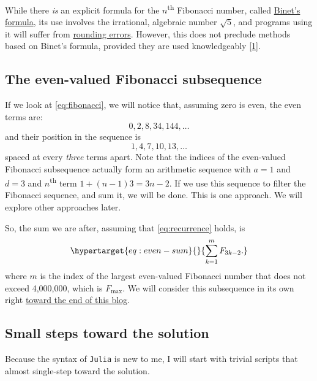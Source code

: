 \documentclass[
  a4paper,
]{article}
\begin{document}
While there \emph{is} an explicit formula for the
\(n\)\textsuperscript{th} Fibonacci number, called
\href{https://artofproblemsolving.com/wiki/index.php/Binet\%27s_Formula}{Binet's
formula}, its use involves the irrational, algebraic number \(\sqrt5\),
and programs using it will suffer from
\href{https://www.cs.drexel.edu/~popyack/Courses/CSP/Fa17/extras/Rounding/index.html}{rounding
errors}. However, this does not preclude methods based on Binet's
formula, provided they are used knowledgeably
{[}\protect\hyperlink{ref-julia-help}{1}{]}.

\hypertarget{the-even-valued-fibonacci-subsequence}{%
\subsection{The even-valued Fibonacci
subsequence}\label{the-even-valued-fibonacci-subsequence}}

If we look at \cref{eq:fibonacci}, we will notice that, assuming zero is
even, the even terms are: \[
0, 2, 8, 34, 144, \ldots
\] and their position in the sequence is \[
1, 4, 7, 10, 13, \ldots
\] spaced at every \emph{three} terms apart. Note that the indices of
the even-valued Fibonacci subsequence actually form an arithmetic
sequence with \(a = 1\) and \(d = 3\) and \(n\)\textsuperscript{th} term
\(1 + (n - 1)3 = 3n - 2\). If we use this sequence to filter the
Fibonacci sequence, and sum it, we will be done. This is one approach.
We will explore other approaches later.

So, the sum we are after, assuming that \cref{eq:recurrence} holds, is
\begin{equation}\protect\hypertarget{eq:even-sum}{}{
\sum_{k=1}^{m}F_{3k-2}.
}\label{eq:even-sum}\end{equation} where \(m\) is the index of the
largest even-valued Fibonacci number that does not exceed 4,000,000,
which is \(F_{\max}\). We will consider this subsequence in its own
right \protect\hyperlink{a-second-look-at-the-problem}{toward the end of
this blog}.

\hypertarget{small-steps-toward-the-solution}{%
\subsection{Small steps toward the
solution}\label{small-steps-toward-the-solution}}

Because the syntax of \texttt{Julia} is new to me, I will start with
trivial scripts that almost single-step toward the solution.
\end{document}
